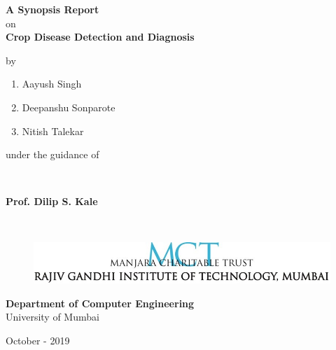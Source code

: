 \begin{titlepage}
\vspace*{0.025cm}
{\centering
\large
{\textbf {A Synopsis Report}}\\
on\\
\vspace{0.90cm}
{\Large\textbf {Crop Disease Detection and Diagnosis}} \\
\vspace{0.65cm}

by\\
\vspace{0.65cm}
\begin{enumerate}
\item \begin{center}Aayush Singh\end{center}
\item \begin{center}Deepanshu Sonparote\end{center}
\item \begin{center}Nitish Talekar\end{center}
\end{enumerate}

\vspace{2cm}
\begin{center}under the guidance of\end{center}\\
\vspace{0.3cm}
\hspace{.05cm} \begin{center}{\large \textbf {Prof. Dilip S. Kale}}\end{center}\\
\vspace{3cm}

\begin{figure}[h]
\centering
\includegraphics[scale=0.8]{college_logo.jpg}
\end{figure}
\hspace{.05cm}
\hspace{.05cm}
\vspace{0.0cm}
\begin{center}
\textbf {Department of Computer Engineering}\\
\vspace{0.35cm}
University of Mumbai\end{center}
\vspace{0.35cm}
\hspace{6.75cm}October - 2019}\\
\end{titlepage}
\newpage

